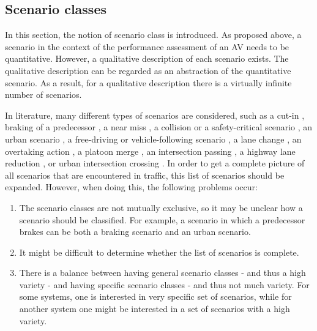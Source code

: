 \subsection{Scenario classes}
\label{sec:scenario classes}
In this section, the notion of scenario class is introduced. As proposed above, a scenario in the context of the performance assessment of an AV needs to be quantitative. However, a qualitative description of each scenario exists. The qualitative description can be regarded as an abstraction of the quantitative scenario. As a result, for a qualitative description there is a virtually infinite number of scenarios.

In literature, many different types of scenarios are considered, such as a cut-in \cite{xu2002effects, gietelink2006development,roesener2017comprehensive}, braking of a predecessor \cite{xu2002effects,deGelder2017assessment,hulshof2013autonomous}, a near miss \cite{gietelink2006development}, a collision or a safety-critical scenario \cite{gietelink2006development,ebner2011identifying}, an urban scenario \cite{zofka2015datadrivetrafficscenarios}, a free-driving or vehicle-following scenario \cite{roesener2017comprehensive}, a lane change \cite{roesener2017comprehensive}, an overtaking action \cite{karaduman2013interactivebehavior}, a platoon merge \cite{englund2016grand}, an intersection passing \cite{englund2016grand}, a highway lane reduction \cite{ploeg2017GCDC}, or urban intersection crossing \cite{ploeg2017GCDC}. In order to get a complete picture of all scenarios that are encountered in traffic, this list of scenarios should be expanded. However, when doing this, the following problems occur:

\begin{enumerate}
	\item The scenario classes are not mutually exclusive, so it may be unclear how a scenario should be classified. For example, a scenario in which a predecessor brakes can be both a braking scenario and an urban scenario. \label{item:mutual exclusiveness}
	\item It might be difficult to determine whether the list of scenarios is complete.  \label{item:completeness}
	\item There is a balance between having general scenario classes - and thus a high variety - and having specific scenario classes - and thus not much variety. For some systems, one is interested in very specific set of scenarios, while for another system one might be interested in a set of scenarios with a high variety. \label{item:generality}
\end{enumerate}

